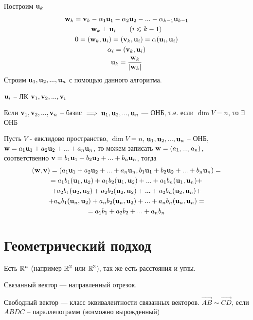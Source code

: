 \documentclass[main]{subfiles}
\begin{document}
Построим $\mathbf{u}_k$
\begin{gather*}
    \mathbf{w}_k = \mathbf{v}_k - \alpha_1 \mathbf{u}_1 - \alpha_2 \mathbf{u}_2 - ... - \alpha_{k-1} \mathbf{u}_{k-1}\\
    \mathbf{w}_k \perp \mathbf{u}_i \qquad (i \leqslant k-1)\\
    0 = (\mathbf{w}_k, \mathbf{u}_i) = (\mathbf{v}_k, \mathbf{u}_i) = \alpha (\mathbf{u}_i, \mathbf{u}_i)\\
    \alpha_i = (\mathbf{v}_k, \mathbf{u}_i)\\
    \mathbf{u}_k = \frac{\mathbf{w}_k}{|\mathbf{w}_k|}
\end{gather*}
Строим $\mathbf{u}_1, \mathbf{u}_2, ..., \mathbf{u}_n$ с помощью данного алгоритма.
\begin{remark}
    $\mathbf{u}_i$ -- ЛК $\mathbf{v}_1, \mathbf{v}_2, ..., \mathbf{v}_i$
\end{remark}

\begin{corollary}
    Если $\mathbf{v}_1, \mathbf{v}_2, ..., \mathbf{v}_n$ -- базис $\implies \mathbf{u}_1, \mathbf{u}_2, ..., \mathbf{u}_n$ --- ОНБ,
    т.е. если $\dim V = n$, то  $\exists$ ОНБ
\end{corollary}

Пусть $V$ - евклидово пространство, $\dim V =n$, $\mathbf{u}_1, \mathbf{u}_2, ..., \mathbf{u}_n$ -- ОНБ,
$\mathbf{w} = a_1 \mathbf{u}_1 +a_2 \mathbf{u}_2 + ... + a_n \mathbf{u}_n$, то можем записать $\mathbf{w} = (a_1, ..., a_n)$,
соответственно $\mathbf{v} = b_1 \mathbf{u}_1 + b_2 \mathbf{u}_2 + ... + b_n \mathbf{u}_n$, тогда
\begin{multline*}
    (\mathbf{w}, \mathbf{v}) = (a_1 \mathbf{u}_1 + a_2 \mathbf{u}_2 + ... + a_n \mathbf{u}_n, b_1 \mathbf{u}_1 + b_2 \mathbf{u}_2 + ... + b_n \mathbf{u}_n) = \\
    = a_1 b_1 (\mathbf{u}_1, \mathbf{u}_2) + a_1 b_2 (\mathbf{u}_1, \mathbf{u}_2) + ... + a_1 b_n (\mathbf{u}_1, \mathbf{u}_n)+\\
    + a_2 b_1 (\mathbf{u}_2, \mathbf{u}_2) + a_2 b_2 (\mathbf{u}_2, \mathbf{u}_2) + ... + a_2 b_n (\mathbf{u}_2, \mathbf{u}_n)+\\
    + a_n b_1 (\mathbf{u}_n, \mathbf{u}_2) + a_n b_2 (\mathbf{u}_n, \mathbf{u}_2) + ... + a_n b_n (\mathbf{u}_n, \mathbf{u}_n)=\\
    = a_1 b_1 + a_2 b_2 + ... + a_n b_n
\end{multline*}

\section{Геометрический подход}
Есть $\mathbb{R}^n$ (например $\mathbb{R}^2$ или $\mathbb{R}^3$), так же есть расстояния и углы.

\begin{definition}
    Связанный вектор --- направленный отрезок.
\end{definition}
\begin{definition}
    Свободный вектор --- класс эквивалентности связанных векторов.
    $\overrightarrow{AB} \sim \overrightarrow{CD}$, если $ABDC$ -- параллелограмм
    (возможно вырожденный)
\end{definition}
\end{document}
